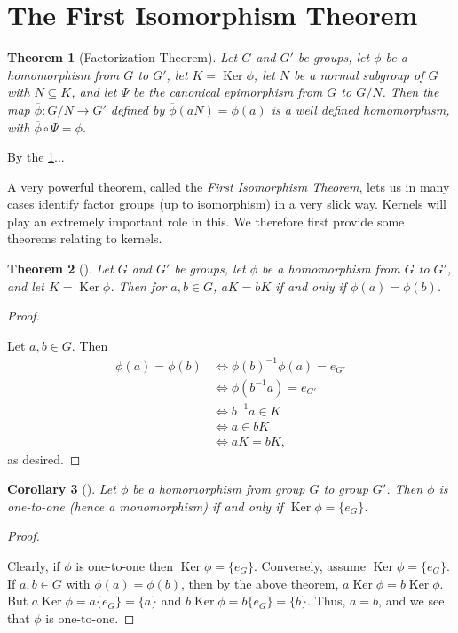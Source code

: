 \documentclass[10pt,]{book}
\theoremstyle{plain}
\newtheorem{theorem}{Theorem}[section]
\newtheorem{corollary}[theorem]{Corollary}
\theoremstyle{definition}
\theoremstyle{definition}
\theoremstyle{definition}
\theoremstyle{definition}
\numberwithin{equation}{section}
\def\phibar{\overline{\phi}}
\DeclareMathOperator{\Ker}{Ker}
\newcommand{\amp}{&}
\begin{document}
\section[{The First Isomorphism Theorem}]{The First Isomorphism Theorem}\label{section-28}
\begin{theorem}[{Factorization Theorem}]\label{test}
Let \(G\) and \(G'\) be groups, let \(\phi\) be a homomorphism from \(G\) to \(G'\), let \(K=\Ker \phi\), let \(N\) be a normal subgroup of \(G\) with \(N\subseteq K\), and let \(\Psi\) be the canonical epimorphism from \(G\) to \(G/N\). Then the map \(\phibar: G/N \to G'\) defined by \(\phibar(aN)=\phi(a)\) is a well defined homomorphism, with \(\phibar \circ \Psi=\phi\).%
\end{theorem}
By the \hyperref[test]{\ref{test}}...%
\par
A very powerful theorem, called the \emph{First Isomorphism Theorem}, lets us in many cases identify factor groups (up to isomorphism) in a very slick way. Kernels will play an extremely important role in this. We therefore first provide some theorems relating to kernels.%
\begin{theorem}[{}]\label{kermean}
Let \(G\) and \(G'\) be groups, let \(\phi\) be a homomorphism from \(G\) to \(G'\), and let \(K=\Ker \phi\). Then for \(a,b\in G\), \(aK=bK\) if and only if \(\phi(a)=\phi(b)\).%
\end{theorem}
\begin{proof}\hypertarget{proof-49}{}
Let \(a,b\in G\). Then%
\begin{align*}
\phi(a)=\phi(b)\amp \Leftrightarrow
\phi(b)^{-1}\phi(a)=e_{G'}\\
\amp \Leftrightarrow \phi(b^{-1}a)=e_{G'}\\
\amp \Leftrightarrow b^{-1}a\in K\\
\amp \Leftrightarrow a \in bK\\
\amp \Leftrightarrow aK=bK,
\end{align*}
as desired.%
\end{proof}
\begin{corollary}[{}]\label{kerone}
Let \(\phi\) be a homomorphism from group \(G\) to group \(G'\). Then \(\phi\) is one-to-one (hence a monomorphism) if and only if \(\Ker \phi=\{e_G\}\).%
\end{corollary}
\begin{proof}\hypertarget{proof-50}{}
Clearly, if \(\phi\) is one-to-one then \(\Ker \phi=\{e_G\}\). Conversely, assume \(\Ker \phi=\{e_G\}\). If \(a,b\in G\) with \(\phi(a)=\phi(b)\), then by the above theorem, \(a\Ker \phi=b\Ker
\phi\). But \(a\Ker \phi=a\{e_G\}=\{a\}\) and \(b\Ker
\phi=b\{e_G\}=\{b\}\). Thus, \(a=b\), and we see that \(\phi\) is one-to-one.%
\end{proof}
\end{document}
